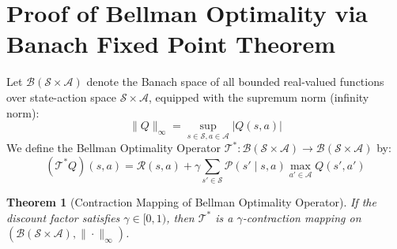 \documentclass[12pt,a4paper,oneside]{report}
\newtheorem{theorem}{Theorem}[chapter]
\begin{document}
\section{Proof of Bellman Optimality via Banach Fixed Point Theorem}
Let $\mathcal{B}(\mathcal{S} \times \mathcal{A})$ denote the Banach space of all bounded real-valued functions over state-action space $\mathcal{S} \times \mathcal{A}$, equipped with the supremum norm (infinity norm):
\begin{equation}
    \|Q\|_\infty = \sup_{s \in \mathcal{S}, a \in \mathcal{A}} |Q(s, a)|
\end{equation}
We define the Bellman Optimality Operator $\mathcal{T}^*: \mathcal{B}(\mathcal{S} \times \mathcal{A}) \to \mathcal{B}(\mathcal{S} \times \mathcal{A})$ by:
\begin{equation}
    (\mathcal{T}^* Q)(s, a) = \mathcal{R}(s, a) + \gamma \sum_{s' \in \mathcal{S}} \mathcal{P}(s' \mid s, a) \max_{a' \in \mathcal{A}} Q(s', a')
\end{equation}

\begin{theorem}[Contraction Mapping of Bellman Optimality Operator]
If the discount factor satisfies $\gamma \in [0, 1)$, then $\mathcal{T}^*$ is a $\gamma$-contraction mapping on $(\mathcal{B}(\mathcal{S} \times \mathcal{A}), \|\cdot\|_\infty)$.
\end{theorem}
\end{document}
